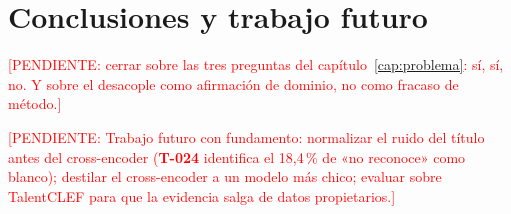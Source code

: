 \documentclass[12pt,a4paper,oneside]{report}
\newcommand{\pend}[1]{\textcolor{red}{\small[PENDIENTE: #1]}}
\newcommand{\tref}[1]{\textbf{T-#1}}
\begin{document}
\chapter{Conclusiones y trabajo futuro}
\label{cap:conclusiones}

\pend{cerrar sobre las tres preguntas del capítulo~\ref{cap:problema}: sí, sí, no. Y sobre
el desacople como afirmación de dominio, no como fracaso de método.}

\pend{Trabajo futuro con fundamento: normalizar el ruido del título antes del
cross-encoder (\tref{024} identifica el 18,4\,\% de «no reconoce» como blanco); destilar el
cross-encoder a un modelo más chico; evaluar sobre TalentCLEF para que la evidencia salga
de datos propietarios.}
\end{document}
